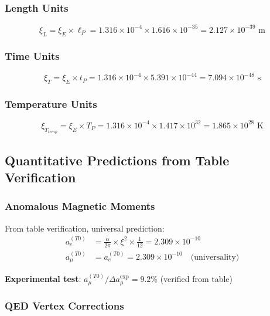 \documentclass[12pt,a4paper]{article}
\begin{document}
	\subsubsection{Length Units}
	\begin{equation}
		\xi_L = \xi_E \times \ell_P = 1.316 \times 10^{-4} \times 1.616 \times 10^{-35} = 2.127 \times 10^{-39} \text{ m}
	\end{equation}
	
	\subsubsection{Time Units}
	\begin{equation}
		\xi_T = \xi_E \times t_P = 1.316 \times 10^{-4} \times 5.391 \times 10^{-44} = 7.094 \times 10^{-48} \text{ s}
	\end{equation}
	
	\subsubsection{Temperature Units}
	\begin{equation}
		\xi_{T_{temp}} = \xi_E \times T_P = 1.316 \times 10^{-4} \times 1.417 \times 10^{32} = 1.865 \times 10^{28} \text{ K}
	\end{equation}
	
	\subsection{Quantitative Predictions from Table Verification}
	\label{subsec:quantitative_predictions}
	
	\subsubsection{Anomalous Magnetic Moments}
	
	From table verification, universal prediction:
	\begin{align}
		a_e^{(T0)} &= \frac{\alpha}{2\pi} \times \xi^2 \times \frac{1}{12} = 2.309 \times 10^{-10} \\
		a_{\mu}^{(T0)} &= a_e^{(T0)} = 2.309 \times 10^{-10} \quad \text{(universality)}
	\end{align}
	
	\textbf{Experimental test}: $a_{\mu}^{(T0)}/\Delta a_{\mu}^{\text{exp}} = 9.2\%$ (verified from table)
	
	\subsubsection{QED Vertex Corrections}
	
\end{document}
